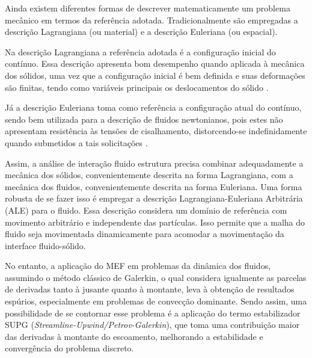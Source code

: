 Ainda existem diferentes formas de descrever matematicamente um problema mecânico em termos da referência adotada. Tradicionalmente são empregadas a descrição Lagrangiana (ou material) e a descrição Euleriana (ou espacial).

Na descrição Lagrangiana a referência adotada é a configuração inicial do contínuo. Essa descrição apresenta bom desempenho quando aplicada à mecânica dos sólidos, uma vez que a configuração inicial é bem definida e suas deformações são finitas, tendo como variáveis principais os deslocamentos do sólido \cite{sanches2014fluid, fernandes2019ale}.

Já a descrição Euleriana toma como referência a configuração atual do contínuo, sendo bem utilizada para a descrição de fluidos newtonianos, pois estes não apresentam resistência às tensões de cisalhamento, distorcendo-se indefinidamente quando submetidos a tais solicitações \cite{sanches2014fluid, fernandes2019ale}.

Assim, a análise de interação fluido estrutura precisa combinar adequadamente a mecânica dos sólidos, convenientemente descrita na forma Lagrangiana, com a mecânica dos fluidos, convenientemente descrita na forma Euleriana. Uma forma robusta de se fazer isso é empregar a descrição Lagrangiana-Euleriana Arbitrária (ALE)  \cite{donea1982arbitrary} para o fluido. Essa descrição considera um domínio de referência com movimento arbitrário e independente das partículas. Isso permite que a malha do fluido seja movimentada dinamicamente para acomodar a movimentação da interface fluido-sólido.


No entanto, a aplicação do MEF em problemas da dinâmica dos fluidos, assumindo o método clássico de Galerkin, o qual considera igualmente as parcelas de derivadas tanto à jusante quanto à montante, leva à obtenção de resultados espúrios, especialmente em problemas de convecção dominante. Sendo assim, uma possibilidade de se contornar esse problema é a aplicação do termo estabilizador SUPG (\textit{Streamline-Upwind/Petrov-Galerkin}), que toma uma contribuição maior das derivadas à montante do escoamento, melhorando a estabilidade e convergência do problema discreto.

